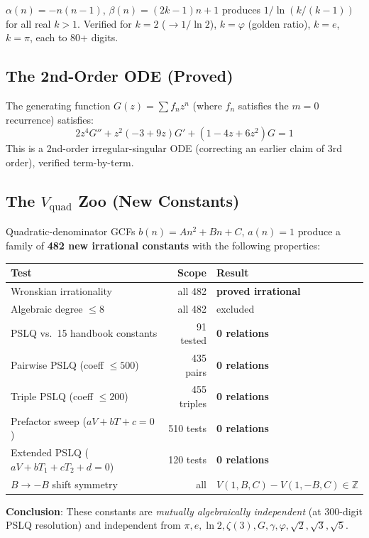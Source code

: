 \documentclass[11pt,a4paper]{article}
\begin{document}
$\alpha(n) = -n(n-1)$, $\beta(n) = (2k{-}1)n + 1$ produces $1/\ln(k/(k{-}1))$ for all real $k > 1$.  Verified for $k = 2$ ($\to 1/\ln 2$), $k = \varphi$ (golden ratio), $k = e$, $k = \pi$, each to 80+ digits.

\subsection{The 2nd-Order ODE (Proved)}

The generating function $G(z) = \sum f_n z^n$ (where $f_n$ satisfies the $m = 0$ recurrence) satisfies:
\[
  2z^4 G'' + z^2(-3 + 9z)G' + (1 - 4z + 6z^2)G = 1
\]
This is a 2nd-order irregular-singular ODE (correcting an earlier claim of 3rd order), verified term-by-term.

\subsection{The $V_{\mathrm{quad}}$ Zoo (New Constants)}

Quadratic-denominator GCFs $b(n) = An^2 + Bn + C$, $a(n) = 1$ produce a family of \textbf{482 new irrational constants} with the following properties:

\begin{center}
\begin{tabular}{lrl}
\toprule
Test & Scope & Result \\
\midrule
Wronskian irrationality & all 482 & \textbf{proved irrational} \\
Algebraic degree $\le 8$ & all 482 & excluded \\
PSLQ vs.\ 15 handbook constants & 91 tested & \textbf{0 relations} \\
Pairwise PSLQ (coeff $\le 500$) & 435 pairs & \textbf{0 relations} \\
Triple PSLQ (coeff $\le 200$) & 455 triples & \textbf{0 relations} \\
Prefactor sweep ($a V + b T + c = 0$) & 510 tests & \textbf{0 relations} \\
Extended PSLQ ($a V + b T_1 + c T_2 + d = 0$) & 120 tests & \textbf{0 relations} \\
$B \to -B$ shift symmetry & all & $V(1, B, C) - V(1, -B, C) \in \mathbb{Z}$ \\
\bottomrule
\end{tabular}
\end{center}

\noindent\textbf{Conclusion}: These constants are \emph{mutually algebraically independent} (at 300-digit PSLQ resolution) and independent from $\pi, e, \ln 2, \zeta(3), G, \gamma, \varphi, \sqrt{2}, \sqrt{3}, \sqrt{5}$.
\end{document}
